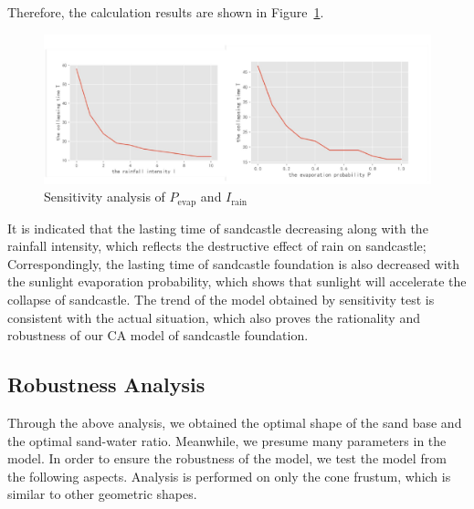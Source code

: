 \documentclass{mcmthesis}		    %
\begin{document}
	Therefore, the calculation results are shown in Figure~\ref{sensitivity}.
	
	\begin{figure}[htbp!]
		\centering
		\includegraphics[width=6in]{sensitiy.pdf}
		\caption{Sensitivity analysis of $P_{\text{evap}}$ and $I_{\text{rain}}$}
		\label{sensitivity}
	\end{figure}
	
	It is indicated that the lasting time of sandcastle decreasing along with the rainfall intensity, which reflects the destructive effect of rain on sandcastle; Correspondingly, the lasting time of sandcastle foundation is also decreased with the sunlight evaporation probability, which shows that sunlight will accelerate the collapse of sandcastle. The trend of the model obtained by sensitivity test is consistent with the actual situation, which also proves the rationality and robustness of our CA model of sandcastle foundation.
	
	\subsection{Robustness Analysis}
	Through the above analysis, we obtained the optimal shape of the sand base and the optimal sand-water ratio. Meanwhile, we presume many parameters in the model. In order to ensure the robustness of the model, we test the model from the following aspects.
	Analysis is performed on only the cone frustum, which is similar to other geometric shapes.
	
\end{document}

